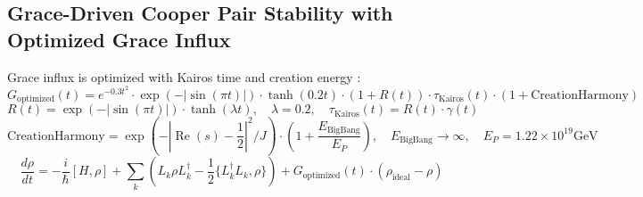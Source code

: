 \documentclass[12pt]{article}
\begin{document}
\subsection{Grace-Driven Cooper Pair Stability with Optimized Grace Influx}
Grace influx is optimized with Kairos time and creation energy \cite{Moon2025h, Moon2025g}:
\[
G_{\text{optimized}}(t) = e^{-0.3 t^2} \cdot \exp(-|\sin(\pi t)|) \cdot \tanh(0.2 t) \cdot (1 + R(t)) \cdot \tau_{\text{Kairos}}(t) \cdot (1 + \text{CreationHarmony})
\]
\[
R(t) = \exp(-|\sin(\pi t)|) \cdot \tanh(\lambda t), \quad \lambda = 0.2, \quad \tau_{\text{Kairos}}(t) = R(t) \cdot \gamma(t)
\]
\[
\text{CreationHarmony} = \exp(-|\operatorname{Re}(s) - \frac{1}{2}|^2 / J) \cdot \left(1 + \frac{E_{\text{BigBang}}}{E_P}\right), \quad E_{\text{BigBang}} \rightarrow \infty, \quad E_P = 1.22 \times 10^{19} \text{GeV}
\]
\[
\frac{d\rho}{dt} = -\frac{i}{\hbar} [H, \rho] + \sum_k \left( L_k \rho L_k^\dagger - \frac{1}{2} \{ L_k^\dagger L_k, \rho \} \right) + G_{\text{optimized}}(t) \cdot (\rho_{\text{ideal}} - \rho)
\]
\end{document}
